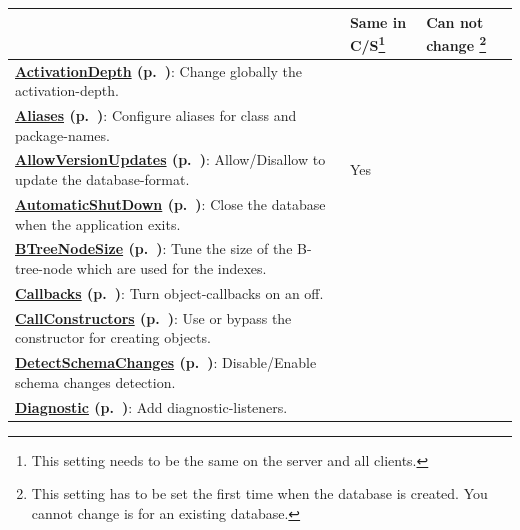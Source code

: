 {\small
\begin{longtable}{|p{}|p{}|p{}|}
\hline
 & Same in C/S\footnote{This setting needs to be the same on the server and all clients.} & Can not change \footnote{This setting has to be set the first time when the database is created. You cannot change is for an existing database.} \\ \hline
\textbf{\hyperref[ref:configuration-common-activation-depth]{ActivationDepth} (p.~\pageref{ref:configuration-common-activation-depth})}: Change globally the activation-depth. &  &  \\ \hline
\textbf{\hyperref[ref:configuration-common-alias]{Aliases} (p.~\pageref{ref:configuration-common-alias})}: Configure aliases for class and package-names. &  &  \\ \hline
\textbf{\hyperref[ref:configuration-common-updating-db4o-file-format]{AllowVersionUpdates} (p.~\pageref{ref:configuration-common-updating-db4o-file-format})}: Allow/Disallow to update the database-format. & Yes &  \\ \hline
\textbf{\hyperref[ref:configuration-common-automatic-shutdown]{AutomaticShutDown} (p.~\pageref{ref:configuration-common-automatic-shutdown})}: Close the database when the application exits. &  &  \\ \hline
\textbf{\hyperref[ref:configuration-common-btree-node-size]{BTreeNodeSize} (p.~\pageref{ref:configuration-common-btree-node-size})}: Tune the size of the B-tree-node which are used for the indexes. &  &  \\ \hline
\textbf{\hyperref[ref:configuration-common-no-callbacks]{Callbacks} (p.~\pageref{ref:configuration-common-no-callbacks})}: Turn object-callbacks on an off. &  &  \\ \hline
\textbf{\hyperref[ref:configuration-common-calling-constructors]{CallConstructors} (p.~\pageref{ref:configuration-common-calling-constructors})}: Use or bypass the constructor for creating objects. &  &  \\ \hline
\textbf{\hyperref[ref:configuration-common-no-schema-changes]{DetectSchemaChanges} (p.~\pageref{ref:configuration-common-no-schema-changes})}: Disable/Enable schema changes detection. &  &  \\ \hline
\textbf{\hyperref[ref:configuration-common-diagnostics]{Diagnostic} (p.~\pageref{ref:configuration-common-diagnostics})}: Add diagnostic-listeners. &  &  \\ \hline

\end{longtable}}
